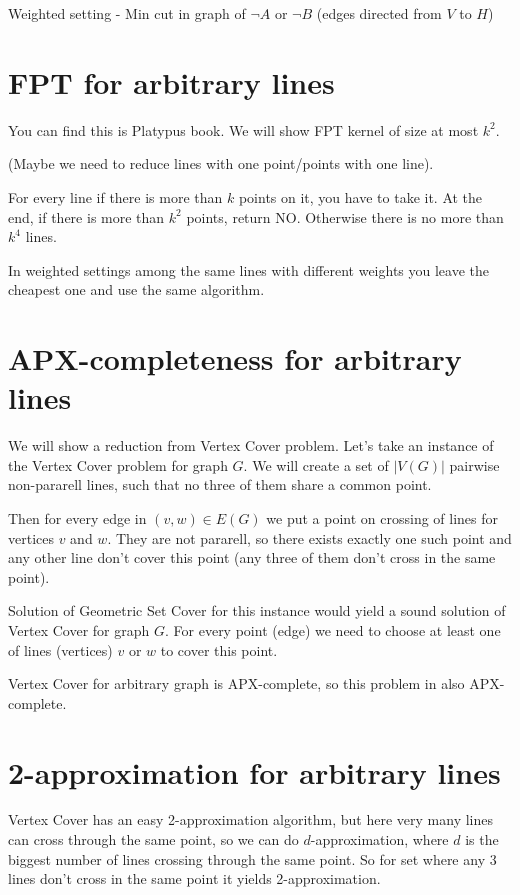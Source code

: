 \documentclass[en]{pracamgr}
\theoremstyle{plain}
\theoremstyle{definition}
\begin{document}
Weighted setting - Min cut in graph of $\neg A$ or $\neg B$
(edges directed from $V$ to $H$)

\section{FPT for arbitrary lines}
You can find this is Platypus book.
We will show FPT kernel of size at most $k^2$.

(Maybe we need to reduce lines with one point/points with one line).

For every line if there is more than $k$ points on it,
you have to take it. At the end, if there is more than $k^2$ points,
return NO.
Otherwise there is no more than $k^4$ lines.

In weighted settings among the same lines with different weights
you leave the cheapest one and use the same algorithm.

\section{APX-completeness for arbitrary lines}
We will show a reduction from Vertex Cover problem.
Let's take an instance of the Vertex Cover problem for graph $G$.
We will create a set of $|V(G)|$ pairwise non-pararell lines,
such that no three of them share a common point.

Then for every edge in $(v, w) \in E(G)$
we put a point on crossing of lines for vertices $v$ and $w$.
They are not pararell, so there exists exactly one such point
and any other line don't cover this point (any three of them don't
cross in the same point).

Solution of Geometric Set Cover for this instance would yield
a sound solution of Vertex Cover for graph $G$.
For every point (edge) we need to choose at least one of
lines (vertices) $v$ or $w$ to cover this point.

Vertex Cover for arbitrary graph is APX-complete,
so this problem in also APX-complete.

\section{2-approximation for arbitrary lines}
Vertex Cover has an easy 2-approximation algorithm,
but here very many lines can cross through
the same point, so we can do $d$-approximation,
where $d$ is the biggest number of lines crossing through the same point.
So for set where any 3 lines don't cross in the same point
it yields 2-approximation.
\end{document}
